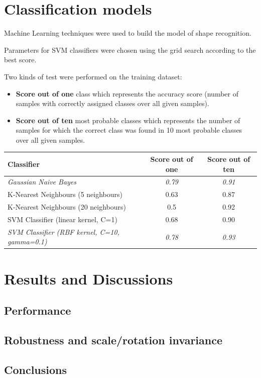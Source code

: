 \documentclass[12pt]{article}
\begin{document}
\section{Classification models}

Machine Learning techniques were used to build the model of shape recognition. 

Parameters for SVM classifiers were chosen using the grid search according to the best score.

Two kinds of test were performed on the training dataset:
\begin{itemize}
	\item \textbf{Score out of one} class which represents the accuracy score (number of samples with correctly assigned classes over all given samples).
	\item \textbf{Score out of ten} most probable classes which represents the number of samples for which the correct class was found in 10 most probable classes over all given samples.
\end{itemize}

\begin{center}
  \begin{tabular}{| l | c | c |}
    \hline
    \textbf{Classifier} & \textbf{Score out of one} & \textbf{Score out of ten}\\ \hline \hline
    \textit{Gaussian Naive Bayes} & \textit{0.79} & \textit{0.91} \\ \hline
	K-Nearest Neighbours (5 neighbours) & 0.63 & 0.87\\ \hline
	K-Nearest Neighbours (20 neighbours) & 0.5 & 0.92 \\ \hline
	SVM Classifier (linear kernel, C=1) & 0.68 & 0.90 \\ \hline
	\textit{SVM Classifier (RBF kernel, C=10, gamma=0.1)} & \textit{0.78} & \textit{0.93} \\ 
	\hline
  \end{tabular}
\end{center}


\section{Results and Discussions}
\subsection{Performance}
\subsection{Robustness and scale/rotation invariance}
\subsection{Conclusions}
\end{document}
